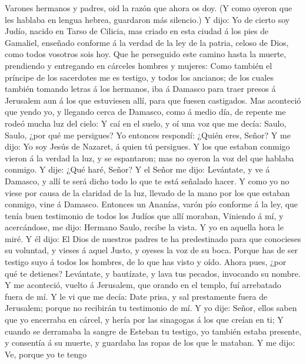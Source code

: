 Varones hermanos y padres, oid la razón que ahora os doy.
 (Y como oyeron que les hablaba en lengua hebrea, guardaron
más silencio.) Y dijo:  Yo de cierto soy Judío, nacido en
Tarso de Cilicia, mas criado en esta ciudad á los pies de Gamaliel,
enseñado conforme á la verdad de la ley de la patria, celoso de Dios,
como todos vosotros sois hoy.  Que he perseguido este camino
hasta la muerte, prendiendo y entregando en cárceles hombres y mujeres:
 Como también el príncipe de los sacerdotes me es testigo, y
todos los ancianos; de los cuales también tomando letras á los hermanos,
iba á Damasco para traer presos á Jerusalem aun á los que estuviesen
allí, para que fuesen castigados.  Mas aconteció que yendo
yo, y llegando cerca de Damasco, como á medio día, de repente me rodeó
mucha luz del cielo:  Y caí en el suelo, y oí una voz que me
decía: Saulo, Saulo, ¿por qué me persigues?  Yo entonces
respondí: ¿Quién eres, Señor? Y me dijo: Yo soy Jesús de Nazaret, á
quien tú persigues.  Y los que estaban conmigo vieron á la
verdad la luz, y se espantaron; mas no oyeron la voz del que hablaba
conmigo.  Y dije: ¿Qué haré, Señor? Y el Señor me dijo:
Levántate, y ve á Damasco, y allí te será dicho todo lo que te está
señalado hacer.  Y como yo no viese por causa de la
claridad de la luz, llevado de la mano por los que estaban conmigo, vine
á Damasco.  Entonces un Ananías, varón pío conforme á la
ley, que tenía buen testimonio de todos los Judíos que allí moraban,
 Viniendo á mí, y acercándose, me dijo: Hermano Saulo,
recibe la vista. Y yo en aquella hora le miré.  Y él dijo:
El Dios de nuestros padres te ha predestinado para que conocieses su
voluntad, y vieses á aquel Justo, y oyeses la voz de su boca.
 Porque has de ser testigo suyo á todos los hombres, de lo
que has visto y oído.  Ahora pues, ¿por qué te detienes?
Levántate, y bautízate, y lava tus pecados, invocando su nombre.
 Y me aconteció, vuelto á Jerusalem, que orando en el
templo, fuí arrebatado fuera de mí.  Y le vi que me decía:
Date prisa, y sal prestamente fuera de Jerusalem; porque no recibirán tu
testimonio de mí.  Y yo dije: Señor, ellos saben que yo
encerraba en cárcel, y hería por las sinagogas á los que creían en ti;
 Y cuando se derramaba la sangre de Esteban tu testigo, yo
también estaba presente, y consentía á su muerte, y guardaba las ropas
de los que le mataban.  Y me dijo: Ve, porque yo te tengo
